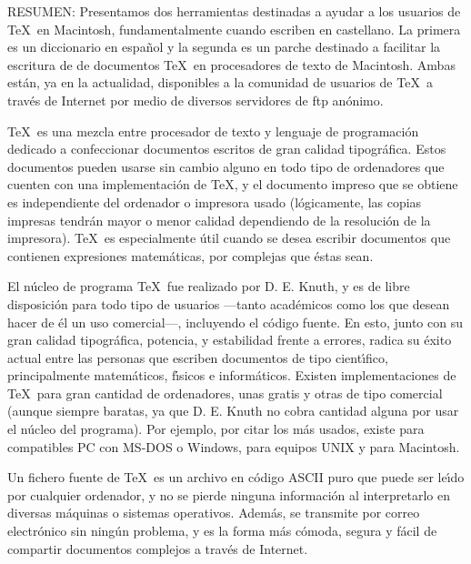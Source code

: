 
{\narrower \eightrm
RESUMEN: 
Presentamos dos herramientas destinadas a ayudar a los usuarios de \TeX\ en
Macintosh, fundamentalmente cuando escriben en castellano. La primera es un
diccionario en espa\~nol y la segunda es un parche destinado a facilitar la
escritura de de documentos \TeX\ en procesadores de texto de Macintosh. Ambas
est\'an, ya en la actualidad, disponibles a la comunidad de usuarios de \TeX\
a trav\'es de Internet por medio de diversos servidores de {\eighttt ftp}
an\'onimo.
\par}

\bigskip



\TeX\ es una mezcla entre procesador de texto y lenguaje de programaci\'on
dedicado a confeccionar documentos escritos de gran calidad tipogr\'afica.
Estos documentos pueden usarse sin cambio alguno en todo tipo de ordenadores
que cuenten con una implementaci\'on de \TeX, y el documento impreso que se
obtiene es independiente del ordenador o impresora usado (l\'ogicamente, las
copias impresas tendr\'an mayor o menor calidad dependiendo de la
resoluci\'on de la impresora). \TeX\ es especialmente \'util cuando se desea
escribir documentos que contienen expresiones matem\'aticas, por complejas que
\'estas sean.

El n\'ucleo de programa \TeX\ fue realizado por D. E. Knuth, y es de libre
disposici\'on para todo tipo de usuarios ---tanto acad\'emicos como los que
desean hacer de \'el un uso comercial---, incluyendo el c\'odigo fuente. En
esto, junto con su gran calidad tipogr\'afica, potencia, y estabilidad frente
a errores, radica su \'exito actual entre las personas que escriben documentos
de tipo cient\'{\i}fico, principalmente matem\'aticos, f\'{\i}sicos e
inform\'aticos. Existen implementaciones de \TeX\ para gran cantidad de
ordenadores, unas gratis y otras de tipo comercial (aunque siempre baratas, ya
que D. E. Knuth no cobra cantidad alguna por usar el n\'ucleo del programa).
Por ejemplo, por citar los m\'as usados, existe para compatibles PC con MS-DOS
o Windows, para equipos UNIX y para Macintosh.

Un fichero fuente de \TeX\ es un archivo en c\'odigo ASCII puro que puede ser
le\'{\i}do por cualquier ordenador, y no se pierde ninguna informaci\'on al
interpretarlo en diversas m\'aquinas o sistemas operativos. Adem\'as, se
transmite por correo electr\'onico sin ning\'un problema, y es la forma
m\'as c\'omoda, segura y f\'acil de compartir documentos complejos a
trav\'es de Internet.

